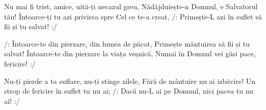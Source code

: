 \beginverse
Nu mai fi trist, amice, uită-ți necazul greu,
Nădăjduiește-n Domnul, e Salvatorul tău!
Întoarce-ți tu azi privirea spre Cel ce te-a creat,
/: Primește-L azi în suflet să fii și tu salvat! :/
\endverse

\beginchorus
/: Întoarce-te din pierzare, din lumea de păcat,
Primește mântuirea să fii și tu salvat!
Întoarce-te din pierzare la viața veșnică,
Numai în Domnul vei găsi pace, fericire! :/
\endchorus

\beginverse
Nu-ți pierde a ta suflare, nu-ți stinge zilele,
Fără de mântuire nu ai izbăvire!
Un strop de fericire în suflet tu nu ai;
/: Dacă nu-L ai pe Domnul, nici pacea tu nu ai! :/
\endverse
\endsong
